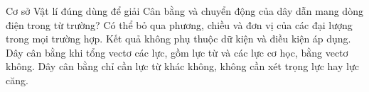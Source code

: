 \begin{ex}
Cơ sở Vật lí đúng dùng để giải Cân bằng và chuyển động của dây dẫn mang dòng điện trong từ trường?
\choice
{Có thể bỏ qua phương, chiều và đơn vị của các đại lượng trong mọi trường hợp.}
{Kết quả không phụ thuộc dữ kiện và điều kiện áp dụng.}
{\True Dây cân bằng khi tổng vectơ các lực, gồm lực từ và các lực cơ học, bằng vectơ không.}
{Dây cân bằng chỉ cần lực từ khác không, không cần xét trọng lực hay lực căng.}
\end{ex}

